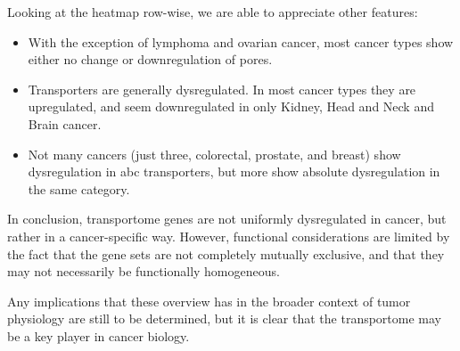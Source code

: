Looking at the heatmap row-wise, we are able to appreciate other features:
\begin{itemize}
    \item With the exception of lymphoma and ovarian cancer, most cancer types show either no change or downregulation of pores.
    \item Transporters are generally dysregulated.
    In most cancer types they are upregulated, and seem downregulated in only Kidney, Head and Neck and Brain cancer.
    \item Not many cancers (just three, colorectal, prostate, and breast) show dysregulation in \gls{abc} transporters, but more show absolute dysregulation in the same category.
\end{itemize}

In conclusion, transportome genes are not uniformly dysregulated in cancer, but rather in a cancer-specific way.
However, functional considerations are limited by the fact that the gene sets are not completely mutually exclusive, and that they may not necessarily be functionally homogeneous.

Any implications that these overview has in the broader context of tumor physiology are still to be determined, but it is clear that the transportome may be a key player in cancer biology.
